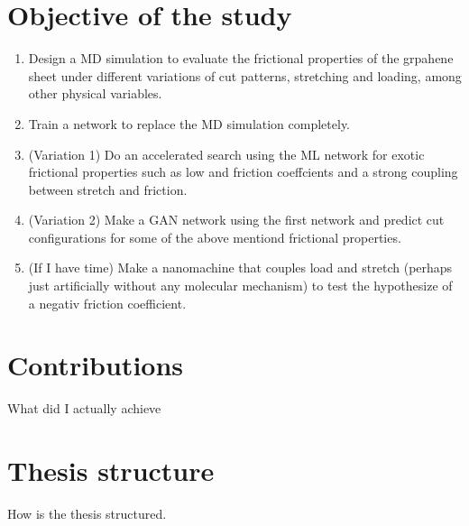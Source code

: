 
%
\section{Objective of the study}

\begin{enumerate}
    \item Design a MD simulation to evaluate the frictional properties of the grpahene sheet under different variations of cut patterns, stretching and loading, among other physical variables.
    \item Train a network to replace the MD simulation completely.
    \item (Variation 1) Do an accelerated search using the ML network for exotic frictional properties such as low and friction coeffcients and a strong coupling between stretch and friction. 
    \item (Variation 2) Make a GAN network using the first network and predict cut configurations for some of the above mentiond frictional properties.
    \item (If I have time) Make a nanomachine that couples load and stretch (perhaps just artificially without any molecular mechanism) to test the hypothesize of a negativ friction coefficient. 
\end{enumerate}


\section{Contributions}

What did I actually achieve

\section{Thesis structure }

How is the thesis structured.





